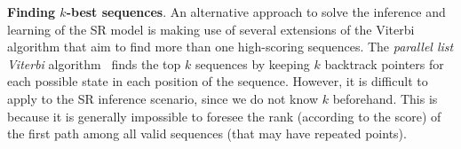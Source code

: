 

\textbf{Finding $k$-best sequences}.
An alternative approach to solve the inference and learning of the SR model is making use of 
several extensions of the Viterbi algorithm that aim to find more than one high-scoring sequences.
The \emph{parallel list Viterbi} algorithm~\cite{seshadri1994list} finds the top $k$ sequences
by keeping $k$ backtrack pointers for each possible state in each position of the sequence.
However, it is difficult to apply to the SR inference scenario,
since we do not know $k$ beforehand.
This is because it is generally impossible to foresee
the rank (according to the score) of the first path among all valid sequences (that may have repeated points).

